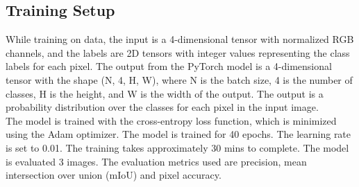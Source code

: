 \subsection{Training Setup}
While training on data, the input is a 4-dimensional tensor with normalized RGB channels, and the labels are 2D tensors with integer values representing the class labels for each pixel. The output from the PyTorch model is a 4-dimensional tensor with the shape (N, 4, H, W), where N is the batch size, 4 is the number of classes, H is the height, and W is the width of the output. The output is a probability distribution over the classes for each pixel in the input image. \\
The model is trained with the cross-entropy loss function, which is minimized using the Adam optimizer. The model is trained for 40 epochs. The learning rate is set to 0.01. The training takes approximately 30 mins to complete. The model is evaluated 3 images. The evaluation metrics used are precision, mean intersection over union (mIoU) and pixel accuracy.
